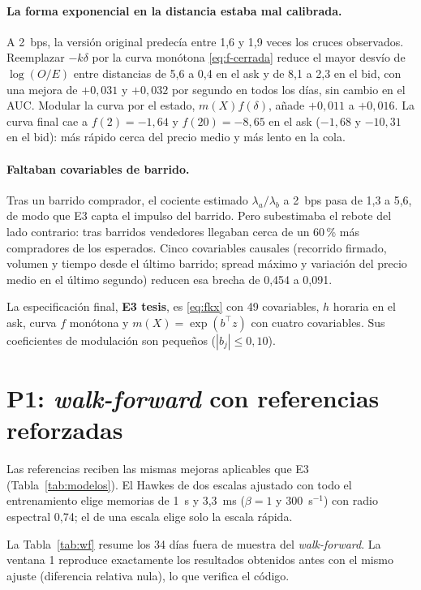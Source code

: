 \paragraph{La forma exponencial en la distancia estaba mal calibrada.} A 2~bps, la versión original predecía entre 1,6 y 1,9 veces los cruces observados. Reemplazar $-k\delta$ por la curva monótona \eqref{eq:f-cerrada} reduce el mayor desvío de $\log(O/E)$ entre distancias de 5,6 a 0,4 en el ask y de 8,1 a 2,3 en el bid, con una mejora de $+0{,}031$ y $+0{,}032$ por segundo en todos los días, sin cambio en el AUC. Modular la curva por el estado, $m(X)f(\delta)$, añade $+0{,}011$ a $+0{,}016$. La curva final cae a $f(2)=-1{,}64$ y $f(20)=-8{,}65$ en el ask ($-1{,}68$ y $-10{,}31$ en el bid): más rápido cerca del precio medio y más lento en la cola.

\paragraph{Faltaban covariables de barrido.} Tras un barrido comprador, el cociente estimado $\lambda_a/\lambda_b$ a 2~bps pasa de 1,3 a 5,6, de modo que E3 capta el impulso del barrido. Pero subestimaba el rebote del lado contrario: tras barridos vendedores llegaban cerca de un 60\,\% más compradores de los esperados. Cinco covariables causales (recorrido firmado, volumen y tiempo desde el último barrido; spread máximo y variación del precio medio en el último segundo) reducen esa brecha de 0,454 a 0,091.

La especificación final, \textbf{E3 tesis}, es \eqref{eq:fkx} con 49 covariables, $h$ horaria en el ask, curva $f$ monótona y $m(X)=\exp(b^\top z)$ con cuatro covariables. Sus coeficientes de modulación son pequeños ($|b_j|\le0{,}10$).


\section{P1: \textit{walk-forward} con referencias reforzadas}
\label{sec:walkforward}

Las referencias reciben las mismas mejoras aplicables que E3 (Tabla~\ref{tab:modelos}). El Hawkes de dos escalas ajustado con todo el entrenamiento elige memorias de 1~s y 3,3~ms ($\beta=1$ y $300$~s$^{-1}$) con radio espectral 0,74; el de una escala elige solo la escala rápida.

La Tabla~\ref{tab:wf} resume los 34 días fuera de muestra del \textit{walk-forward}. La ventana 1 reproduce exactamente los resultados obtenidos antes con el mismo ajuste (diferencia relativa nula), lo que verifica el código.

